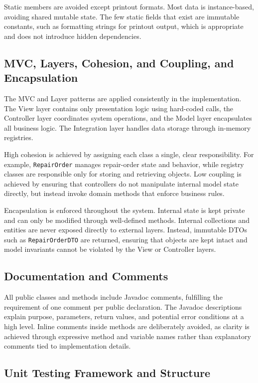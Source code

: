 \documentclass[a4paper]{scrartcl}
\begin{document}
Static members are avoided except printout formats. Most data is instance-based, avoiding shared mutable state. The few static fields that exist are immutable constants, such as formatting strings for printout output, which is appropriate and does not introduce hidden dependencies.

\subsection{MVC, Layers, Cohesion, and Coupling, and Encapsulation}

The MVC and Layer patterns are applied consistently in the implementation. The View layer contains only presentation logic using hard-coded calls, the Controller layer coordinates system operations, and the Model layer encapsulates all business logic. The Integration layer handles data storage through in-memory registries.

High cohesion is achieved by assigning each class a single, clear responsibility. For example, \texttt{RepairOrder} manages repair-order state and behavior, while registry classes are responsible only for storing and retrieving objects. Low coupling is achieved by ensuring that controllers do not manipulate internal model state directly, but instead invoke domain methods that enforce business rules.

Encapsulation is enforced throughout the system. Internal state is kept private and can only be modified through well-defined methods. Internal collections and entities are never exposed directly to external layers. Instead, immutable DTOs such as \texttt{RepairOrderDTO} are returned, ensuring that objects are kept intact and model invariants cannot be violated by the View or Controller layers.

\subsection{Documentation and Comments}

All public classes and methods include Javadoc comments, fulfilling the requirement of one comment per public declaration. The Javadoc descriptions explain purpose, parameters, return values, and potential error conditions at a high level. Inline comments inside methods are deliberately avoided, as clarity is achieved through expressive method and variable names rather than explanatory comments tied to implementation details.

\subsection{Unit Testing Framework and Structure}
\end{document}
